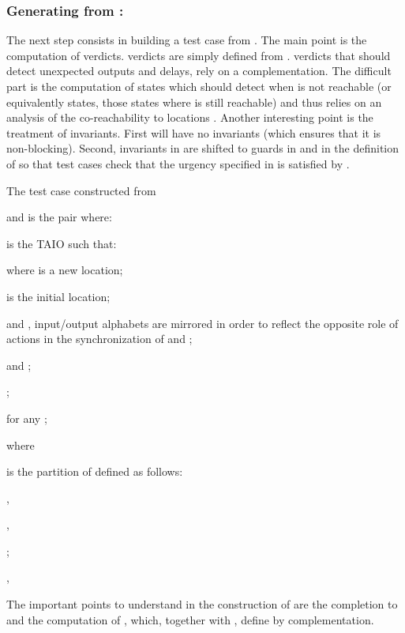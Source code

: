 \documentclass{LMCS}
\theoremstyle{plain}\newtheorem{proposition}[thm]{Proposition}
\begin{document}
\subsubsection*{Generating   from :}
The next step consists in building a test case  from .
The main point is the computation of verdicts.
  verdicts are simply defined from .
 verdicts that should detect unexpected outputs and delays, 
rely on a complementation. The difficult part is the computation of  
 states
which should detect when  is not reachable 
(or equivalently 
 states, those states where  is still reachable)
and thus relies on an analysis of the co-reachability to locations .
Another interesting point is the treatment of invariants.
First  will have no invariants 
(which ensures that it is non-blocking).
Second, invariants in  
are shifted to guards in  and
in the definition of 
so that 
test cases check that  the urgency specified in  is satisfied by .


The test case constructed from

and  is the pair 
where:
\begin{iteMize}{}
\item  is the TAIO
such that: 
\begin{iteMize}{}
\item  where  is a new
location; 
\item  is the initial location;
\item  and
, \ie input/output alphabets
are mirrored in order to reflect the opposite role of actions in the
synchronization of  and ; 
\item  and
; 
\item ; 
\item  for any ; 
\item  where

\end{iteMize}
\item 
  is the partition of  defined as follows:
\begin{iteMize}{}
\item ,
\item , 
\item ;
\item ,
 \end{iteMize}
\end{iteMize}\medskip

\noindent The important points to understand in the construction of  are
the completion to  and the computation of ,
which, together with ,  define  by complementation.  
\end{document}
